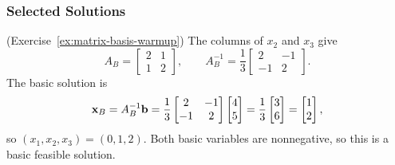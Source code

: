 \subsubsection*{Selected Solutions}

\begin{solution}(Exercise~\ref{ex:matrix-basis-warmup})
The columns of \( x_2 \) and \( x_3 \) give
\[
A_B =
\begin{bmatrix}
    2 & 1 \\
    1 & 2
\end{bmatrix},
\qquad
A_B^{-1} = \frac{1}{3}
\begin{bmatrix}
    2 & -1 \\
    -1 & 2
\end{bmatrix}.
\]
The basic solution is
\[
\mathbf{x}_B = A_B^{-1}\mathbf{b} = \frac{1}{3}
\begin{bmatrix}
    2 & -1 \\
    -1 & 2
\end{bmatrix}
\begin{bmatrix}
    4 \\ 5
\end{bmatrix}
= \frac{1}{3}
\begin{bmatrix}
    3 \\ 6
\end{bmatrix}
=
\begin{bmatrix}
    1 \\ 2
\end{bmatrix},
\]
so \( (x_1, x_2, x_3) = (0, 1, 2) \).  Both basic variables are nonnegative, so this is a basic feasible solution.
\end{solution}

